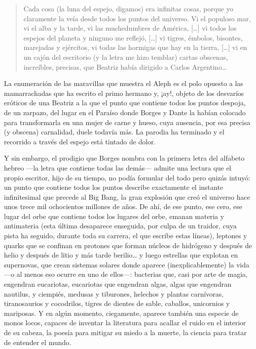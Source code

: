 \documentclass[11pt,a4paper]{article}
\begin{document}
\begin{quotation}
Cada cosa (la luna del espejo, digamos) era infinitas cosas, porque yo claramente la veía desde todos los puntos del universo. Vi el populoso mar, vi el alba y la tarde, vi las muchedumbres de América, […] vi todos los espejos del planeta y ninguno me reflejó, […] vi tigres, émbolos, bisontes, marejadas y ejércitos, vi todas las hormigas que hay en la tierra, […] vi en un cajón del escritorio (y la letra me hizo temblar) cartas obscenas, increíbles, precisas, que Beatriz había dirigido a Carlos Argentino…
\end{quotation}

La enumeración de las maravillas que muestra el Aleph es el polo opuesto a las mamarrachadas que ha escrito el primo hermano y, ¡ay!, objeto de los desvaríos eróticos de una Beatriz a la que el punto que contiene todos los puntos despoja, de un zarpazo, del lugar en el Paraíso donde Borges y Dante la habían colocado para transformarla en una mujer de carne y hueso, cuya ausencia, por esa precisa (y obscena) carnalidad, duele todavía más. La parodia ha terminado y el recorrido a través del espejo está tintado de dolor.

Y sin embargo, el prodigio que Borges nombra con la primera letra del alfabeto hebreo ---la letra que contiene todas las demás--- admite una lectura que el propio escritor, hijo de su tiempo, no podía formular del todo pero quizás intuyó: un punto que contiene todos los puntos describe exactamente el instante infinitesimal que precede al Big Bang, la gran explosión que creó el universo hace unos trece mil ochocientos millones de años. De ahí, de ese punto, ese cero, ese lugar del orbe que contiene todos los lugares del orbe, emanan materia y antimateria (esta última desaparece enseguida, por culpa de un traidor, cuya pista ha seguido, durante toda su carrera, el que escribe estas líneas), leptones y quarks que se confinan en protones que forman núcleos de hidrógeno y después de helio y después de litio y más tarde berilio… y luego estrellas que explotan en supernovas, que crean sistemas solares donde aparece (inexplicablemente) la vida ---o al menos eso ocurre en uno de ellos---: bacterias que, casi por arte de magia, engendran eucariotas, eucariotas que engendran algas, algas que engendran nautilus, y ciempiés, medusas y tiburones, helechos y plantas carnívoras, tiranosaurios y cocodrilos, tigres de dientes de sable, caballos, unicornios y mariposas. Y en algún momento, ciegamente, aparece también una especie de monos locos, capaces de inventar la literatura para acallar el ruido en el interior de su cabeza, la poesía para mitigar su miedo a la muerte, la ciencia para tratar de entender el mundo.
\end{document}
